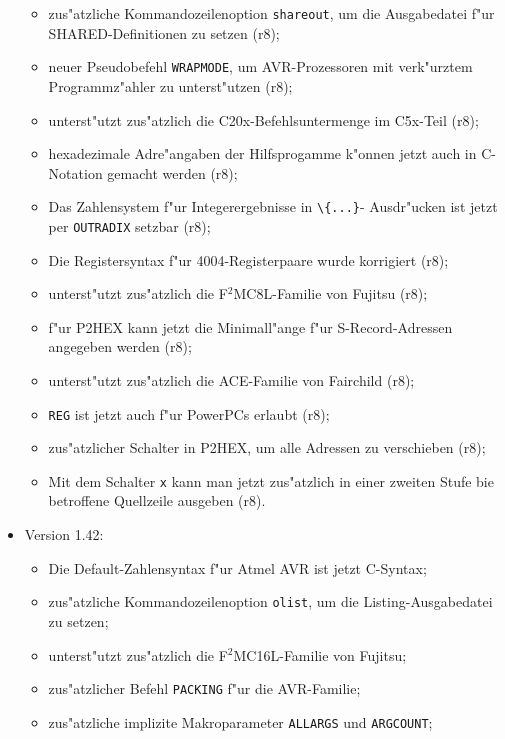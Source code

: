 \documentclass[12pt,a4paper,twoside]{report}
\newcommand{\tty}[1]{{\tt #1}}
\begin{document}
\begin{itemize}
{\begin{itemize}
{            referenziert werden (r8);}
      \item{zus"atzliche Kommandozeilenoption {\tt shareout}, um die
            Ausgabedatei f"ur SHARED-Definitionen zu setzen (r8);}
      \item{neuer Pseudobefehl {\tt WRAPMODE}, um AVR-Prozessoren mit
            verk"urztem Programmz"ahler zu unterst"utzen (r8);}
      \item{unterst"utzt zus"atzlich die C20x-Befehlsuntermenge im
            C5x-Teil (r8);}
      \item{hexadezimale Adre"angaben der Hilfsprogamme k"onnen jetzt
            auch in C-Notation gemacht werden (r8);}
      \item{Das Zahlensystem f"ur Integerergebnisse in \verb!\{...}!-
            Ausdr"ucken ist jetzt per \tty{OUTRADIX} setzbar (r8);}
      \item{Die Registersyntax f"ur 4004-Registerpaare wurde korrigiert
            (r8);}
      \item{unterst"utzt zus"atzlich die F$^{2}$MC8L-Familie von Fujitsu
            (r8);}
      \item{f"ur P2HEX kann jetzt die Minimall"ange f"ur S-Record-Adressen
            angegeben werden (r8);}
      \item{unterst"utzt zus"atzlich die ACE-Familie von Fairchild (r8);}
      \item{{\tt REG} ist jetzt auch f"ur PowerPCs erlaubt (r8);}
      \item{zus"atzlicher Schalter in P2HEX, um alle Adressen zu
            verschieben (r8);}
      \item{Mit dem Schalter \tty{x} kann man jetzt zus"atzlich in einer
            zweiten Stufe bie betroffene Quellzeile ausgeben (r8).}
      \end{itemize}}
\item{Version 1.42:
      \begin{itemize}
      \item{Die Default-Zahlensyntax f"ur Atmel AVR ist jetzt C-Syntax;}
      \item{zus"atzliche Kommandozeilenoption {\tt olist}, um die
            Listing-Ausgabedatei zu setzen;}
      \item{unterst"utzt zus"atzlich die F$^{2}$MC16L-Familie von Fujitsu;}
      \item{zus"atzlicher Befehl {\tt PACKING} f"ur die AVR-Familie;}
      \item{zus"atzliche implizite Makroparameter {\tt ALLARGS} und
            {\tt ARGCOUNT};}

\end{itemize}}
\end{itemize}
\end{document}
